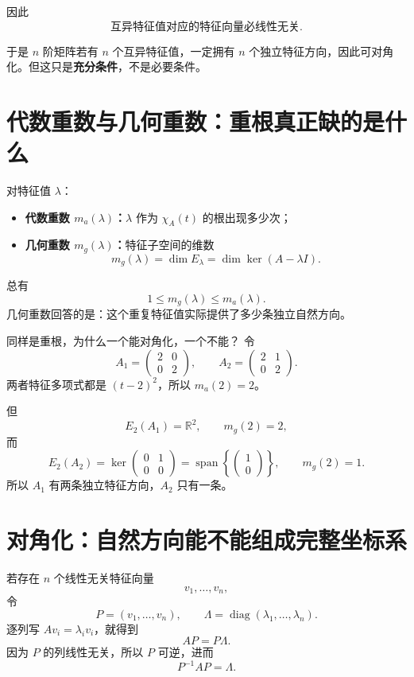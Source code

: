 \documentclass[11pt,a4paper]{ctexart}
\newcommand{\kw}[1]{\textbf{\color{deep}#1}}
\begin{document}
因此
\[
\boxed{\text{互异特征值对应的特征向量必线性无关}.}
\]

于是 $n$ 阶矩阵若有 $n$ 个互异特征值，一定拥有 $n$ 个独立特征方向，因此可对角化。但这只是\kw{充分条件}，不是必要条件。

\section{代数重数与几何重数：重根真正缺的是什么}

对特征值 $\lambda$：

\begin{itemize}
  \item \kw{代数重数 $m_a(\lambda)$：}$\lambda$ 作为 $\chi_A(t)$ 的根出现多少次；
  \item \kw{几何重数 $m_g(\lambda)$：}特征子空间的维数
  \[
  m_g(\lambda)=\dim E_\lambda=\dim\ker(A-\lambda I).
  \]
\end{itemize}

总有
\[
1\le m_g(\lambda)\le m_a(\lambda).
\]
几何重数回答的是：这个重复特征值实际提供了多少条独立自然方向。

\begin{examplebox}{同样是重根，为什么一个能对角化，一个不能？}
令
\[
A_1=\begin{pmatrix}2&0\\0&2\end{pmatrix},
\qquad
A_2=\begin{pmatrix}2&1\\0&2\end{pmatrix}.
\]
两者特征多项式都是 $(t-2)^2$，所以 $m_a(2)=2$。

但
\[
E_2(A_1)=\mathbb R^2,
\qquad m_g(2)=2,
\]
而
\[
E_2(A_2)=\ker\begin{pmatrix}0&1\\0&0\end{pmatrix}
=\operatorname{span}\left\{\begin{pmatrix}1\\0\end{pmatrix}\right\},
\qquad m_g(2)=1.
\]
所以 $A_1$ 有两条独立特征方向，$A_2$ 只有一条。
\end{examplebox}

\section{对角化：自然方向能不能组成完整坐标系}

若存在 $n$ 个线性无关特征向量
\[
v_1,\dots,v_n,
\]
令
\[
P=(v_1,\dots,v_n),
\qquad
\Lambda=\operatorname{diag}(\lambda_1,\dots,\lambda_n).
\]
逐列写 $Av_i=\lambda_i v_i$，就得到
\[
\boxed{AP=P\Lambda.}
\]
因为 $P$ 的列线性无关，所以 $P$ 可逆，进而
\[
\boxed{P^{-1}AP=\Lambda.}
\]
\end{document}
